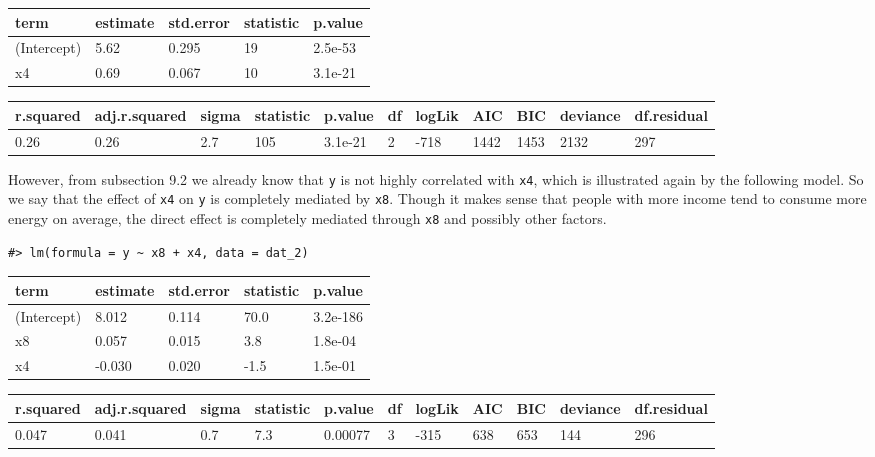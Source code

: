 \documentclass[main.tex]{subfiles}
\begin{document}
\begin{table}[H]
\centering
\begin{tabular}{lllll}
\toprule
term & estimate & std.error & statistic & p.value\\
\midrule
(Intercept) & 5.62 & 0.295 & 19 & 2.5e-53\\
x4 & 0.69 & 0.067 & 10 & 3.1e-21\\
\bottomrule
\end{tabular}
\end{table}

\begin{table}[H]
\centering
\begin{tabular}{lllllllllll}
\toprule
r.squared & adj.r.squared & sigma & statistic & p.value & df & logLik & AIC & BIC & deviance & df.residual\\
\midrule
0.26 & 0.26 & 2.7 & 105 & 3.1e-21 & 2 & -718 & 1442 & 1453 & 2132 & 297\\
\bottomrule
\end{tabular}
\end{table}

However, from subsection 9.2 we already know that \texttt{y} is not
highly correlated with \texttt{x4}, which is illustrated again by the
following model. So we say that the effect of \texttt{x4} on \texttt{y}
is completely mediated by \texttt{x8}. Though it makes sense that people
with more income tend to consume more energy on average, the direct
effect is completely mediated through \texttt{x8} and possibly other
factors.

\begin{verbatim}
#> lm(formula = y ~ x8 + x4, data = dat_2)
\end{verbatim}

\begin{table}[H]
\centering
\begin{tabular}{lllll}
\toprule
term & estimate & std.error & statistic & p.value\\
\midrule
(Intercept) & 8.012 & 0.114 & 70.0 & 3.2e-186\\
x8 & 0.057 & 0.015 & 3.8 & 1.8e-04\\
x4 & -0.030 & 0.020 & -1.5 & 1.5e-01\\
\bottomrule
\end{tabular}
\end{table}

\begin{table}[H]
\centering
\begin{tabular}{lllllllllll}
\toprule
r.squared & adj.r.squared & sigma & statistic & p.value & df & logLik & AIC & BIC & deviance & df.residual\\
\midrule
0.047 & 0.041 & 0.7 & 7.3 & 0.00077 & 3 & -315 & 638 & 653 & 144 & 296\\
\bottomrule
\end{tabular}
\end{table}
\end{document}
